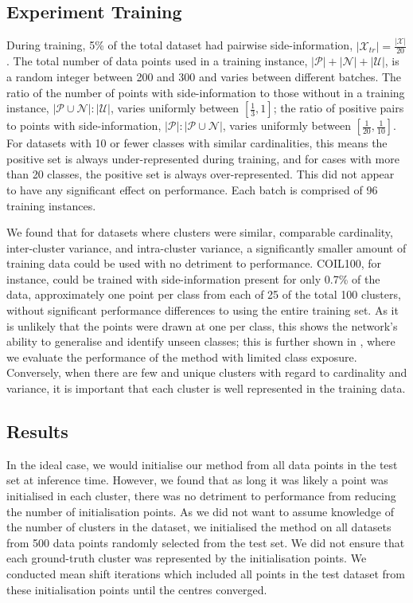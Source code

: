 \documentclass[../thesis.tex]{subfiles}
\begin{document}
\subsection{Experiment Training}
During training, 5\% of the total dataset had pairwise side-information, $|\mathcal{X}_{tr}| = \frac{|\mathcal{X}|}{20}$.
The total number of data points used in a training instance, $|\mathcal P|+|\mathcal N|+|\mathcal U|$, is a random integer between 200 and 300 and varies between different batches. 
The ratio of 
the number of points with side-information to those without in a training instance, 
$|\mathcal P \cup \mathcal N| : |\mathcal U|$, varies uniformly between $[\frac{1}{3}, 1]$; 
the ratio of positive pairs to points with side-information, $|\mathcal P|:|\mathcal P \cup \mathcal N|$, varies uniformly between $[\frac{1}{20}, \frac{1}{10}]$. 
For datasets with 10 or fewer classes with similar cardinalities, this means the positive set is always under-represented during training, and for cases with more than 20 classes, the positive set is always over-represented. This did not appear to have any significant effect on performance. Each batch is comprised of 96 training instances.

We found that for datasets where clusters were similar,
\ie comparable cardinality, inter-cluster variance, and intra-cluster variance, a significantly smaller amount of training data could be used with no detriment to performance.
COIL100, for instance, could be trained with side-information present for only 0.7\% of the data, approximately one point per class from each of 25 of the total 100 clusters, without significant performance differences to using the entire training set. As it is unlikely that the points were drawn at one per class, this shows the network's ability to generalise and identify unseen classes; this is further shown in , where we evaluate the performance of the method with limited class exposure.
Conversely, when there are few and unique clusters with regard to cardinality and variance, it is important that each cluster is well represented in the training data.

\subsection{Results}\label{sec__DMS__testandresults}

In the ideal case, we would initialise our method from all data points in the test set at inference time. 
However, we found that as long it was likely a point was initialised in each cluster, there was no detriment to performance from reducing the number of initialisation points. 
As we did not want to assume knowledge of the number of clusters in the dataset, we initialised the method on all datasets from 500 data points randomly selected from the test set. 
We did not ensure that each ground-truth cluster was represented by the initialisation points.
We conducted mean shift iterations which included all points in the test dataset from these initialisation points until the centres converged. 
\end{document}
